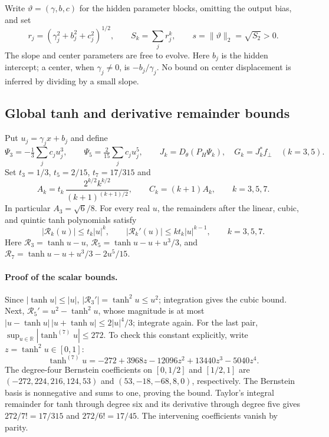 Write $\vartheta=(\gamma,b,c)$ for the hidden parameter blocks, omitting
the output bias, and set
\begin{equation}
 r_j=(\gamma_j^2+b_j^2+c_j^2)^{1/2},\qquad
 S_k=\sum_j r_j^k,\qquad s=\|\vartheta\|_2=\sqrt{S_2}>0.
 \label{eq:feature-radius}
\end{equation}
The slope and center parameters are free to evolve. Here $b_j$ is the
hidden intercept; a center, when $\gamma_j\ne0$, is $-b_j/\gamma_j$.
No bound on center displacement is inferred by dividing by a small slope.

\subsection{Global tanh and derivative remainder bounds}
Put $u_j=\gamma_jx+b_j$ and define
\begin{equation}
 \Psi_3=-\tfrac13\sum_j c_ju_j^3,\qquad
 \Psi_5=\tfrac2{15}\sum_j c_ju_j^5,\qquad
 J_k=D_\theta(P_H\Psi_k),\quad G_k=J_k^*f_\perp\quad(k=3,5).
 \label{eq:feature-polynomials}
\end{equation}
Set $t_3=1/3$, $t_5=2/15$, $t_7=17/315$ and
\begin{equation}
 A_k=t_k\,\frac{2^{k/2}k^{k/2}}{(k+1)^{(k+1)/2}},\qquad
 C_k=(k+1)A_k,\qquad k=3,5,7.
 \label{eq:feature-constants}
\end{equation}
In particular $A_3=\sqrt6/8$. For every real $u$, the remainders after
the linear, cubic, and quintic tanh polynomials satisfy
\begin{equation}
 |\mathcal R_k(u)|\le t_k|u|^k,\qquad
 |\mathcal R_k'(u)|\le kt_k|u|^{k-1},\qquad k=3,5,7.
 \label{eq:feature-scalar-remainders}
\end{equation}
Here $\mathcal R_3=\tanh u-u$, $\mathcal R_5=\tanh u-u+u^3/3$,
and $\mathcal R_7=\tanh u-u+u^3/3-2u^5/15$.

\paragraph{Proof of the scalar bounds.}
Since $|\tanh u|\le|u|$, $|\mathcal R_3'|=\tanh^2u\le u^2$;
integration gives the cubic bound. Next,
$\mathcal R_5'=u^2-\tanh^2u$, whose magnitude is at most
$|u-\tanh u|\,|u+\tanh u|\le2|u|^4/3$; integrate again.
For the last pair, $\sup_{u\in\mathbb R}|\tanh^{(7)}u|\le272$.
To check this constant explicitly, write $z=\tanh^2u\in[0,1]$:
\[
 \tanh^{(7)}u=-272+3968z-12096z^2+13440z^3-5040z^4.
\]
The degree-four Bernstein coefficients on $[0,1/2]$ and $[1/2,1]$ are
$(-272,224,216,124,53)$ and $(53,-18,-68,8,0)$, respectively.
The Bernstein basis is nonnegative and sums to one, proving the bound.
Taylor's integral remainder for tanh through degree six and its derivative
through degree five gives $272/7!=17/315$ and $272/6!=17/45$.
The intervening coefficients vanish by parity.

